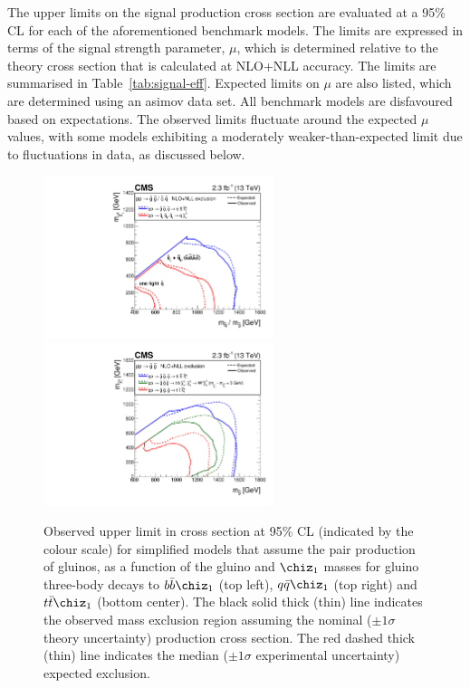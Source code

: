 The upper limits on the signal production cross section are evaluated
at a 95\% CL for each of the aforementioned benchmark models. The
limits are expressed in terms of the signal strength parameter, $\mu$,
which is determined relative to the theory cross section that is
calculated at NLO+NLL accuracy. The limits are summarised in
Table~\ref{tab:signal-eff}. Expected limits on $\mu$ are also listed,
which are determined using an asimov data set. All benchmark models
are disfavoured based on expectations. The observed limits fluctuate
around the expected $\mu$ values, with some models exhibiting a
moderately weaker-than-expected limit due to fluctuations in data, as
discussed below.

\begin{figure}[!h]
  \begin{center}
    \includegraphics[width=0.6\textwidth]{figures/limits/v1/mixSUMMARY.pdf}
    \includegraphics[width=0.6\textwidth]{figures/limits/v1/gluinoSUMMARY.pdf} 
    \caption{Observed upper limit in cross section at 95\% CL
      (indicated by the colour scale) for simplified models that
      assume the pair production of gluinos, as a function of the
      gluino and $\chiz_{1}$ masses for gluino three-body decays to
      $b\bar{b}\chiz_{1}$ (top left), $q\bar{q}\chiz_{1}$ (top right) and $t\bar{t}\chiz_{1}$ (bottom center). 
      The black solid thick (thin) line indicates the observed mass
      exclusion region assuming the nominal (${\pm}1 \sigma$ theory
      uncertainty) production cross section. The red dashed thick
      (thin) line indicates the median (${\pm}1 \sigma$ experimental
      uncertainty) expected exclusion.
    }
    \label{fig:limits-sms-1} 
  \end{center}
\end{figure}

